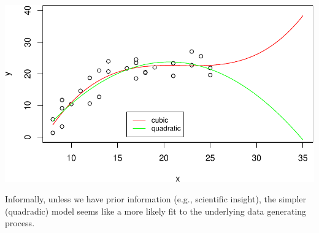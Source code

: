 \documentclass[
]{article}
\begin{document}
\includegraphics{hw9_files/figure-latex/unnamed-chunk-10-1.pdf}

Informally, unless we have prior information (e.g., scientific insight),
the simpler (quadradic) model seems like a more likely fit to the
underlying data generating process.
\end{document}

